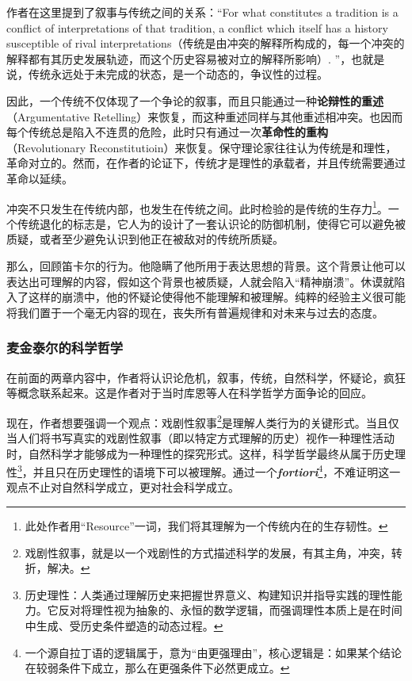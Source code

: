\documentclass[12pt, a4paper, oneside]{ctexart}
\renewcommand{\b}{\textbf}
\newcommand{\f}{\footnote}
\begin{document}
作者在这里提到了叙事与传统之间的关系：“For what constitutes a tradition is a conflict of interpretations of that tradition, a conflict which itself has a history susceptible of rival interpretations（传统是由冲突的解释所构成的，每一个冲突的解释都有其历史发展轨迹，而这个历史容易被对立的解释所影响）. ”，也就是说，传统永远处于未完成的状态，是一个动态的，争议性的过程。

因此，一个传统不仅体现了一个争论的叙事，而且只能通过一种\b{论辩性的重述}（Argumentative Retelling）来恢复，而这种重述同样与其他重述相冲突。也因而每个传统总是陷入不连贯的危险，此时只有通过一次\b{革命性的重构}（Revolutionary Reconstitutioin）来恢复。保守理论家往往认为传统是和理性，革命对立的。然而，在作者的论证下，传统才是理性的承载者，并且传统需要通过革命以延续。

冲突不只发生在传统内部，也发生在传统之间。此时检验的是传统的生存力\f{此处作者用“Resource”一词，我们将其理解为一个传统内在的生存韧性。}。一个传统退化的标志是，它人为的设计了一套认识论的防御机制，使得它可以避免被质疑，或者至少避免认识到他正在被敌对的传统所质疑。

那么，回顾笛卡尔的行为。他隐瞒了他所用于表达思想的背景。这个背景让他可以表达出可理解的内容，假如这个背景也被质疑，人就会陷入“精神崩溃”。休谟就陷入了这样的崩溃中，他的怀疑论使得他不能理解和被理解。纯粹的经验主义很可能将我们置于一个毫无内容的现在，丧失所有普遍规律和对未来与过去的态度。

\subsubsection{麦金泰尔的科学哲学}

在前面的两章内容中，作者将认识论危机，叙事，传统，自然科学，怀疑论，疯狂等概念联系起来。这是作者对于当时库恩等人在科学哲学方面争论的回应。

现在，作者想要强调一个观点：戏剧性叙事\f{戏剧性叙事，就是以一个戏剧性的方式描述科学的发展，有其主角，冲突，转折，解决。}是理解人类行为的关键形式。当且仅当人们将书写真实的戏剧性叙事（即以特定方式理解的历史）视作一种理性活动时，自然科学才能够成为一种理性的探究形式。这样，科学哲学最终从属于历史理性\f{历史理性：人类通过理解历史来把握世界意义、构建知识并指导实践的理性能力。它反对将理性视为抽象的、永恒的数学逻辑，而强调理性本质上是在时间中生成、受历史条件塑造的动态过程。}，并且只在历史理性的语境下可以被理解。通过一个\textit{\b{fortiori}}\f{一个源自拉丁语的逻辑属于，意为“由更强理由”，核心逻辑是：如果某个结论在较弱条件下成立，那么在更强条件下必然更成立。}，不难证明这一观点不止对自然科学成立，更对社会科学成立。
\end{document}
